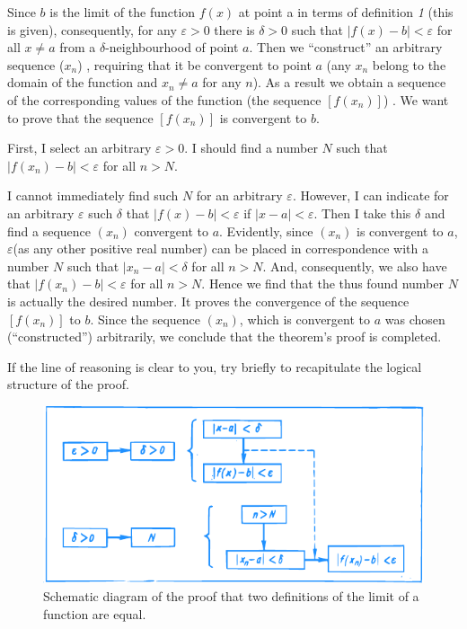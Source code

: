 {Since $b$ is the limit of the function $f (x)$ at point a in terms of definition \emph{1} (this is given), consequently, for any $\varepsilon > 0$ there is $\delta > 0$ such that $| f(x)- b | < \varepsilon$  for all $x \neq a$ from a $\delta$-neighbourhood of point $a$. Then we ``construct''	an	arbitrary	sequence	($x_{n}$) ,	requiring	that	it	be convergent to point $a$ (any $x_{n}$ belong to the domain of the function and $x_{n} \neq a$ for any $n$). As a result we obtain a sequence of the corresponding values of the function (the sequence	$[f (x_{n} ) ]$) .	We	want	to	prove	that	the	sequence $[f (x_{n} )]$ is convergent to $b$.

First, I select an arbitrary $\varepsilon > 0$. I should find a number $N$ such that $|f(x_{n}) -	b| < \varepsilon$ for all $n > N$.

I cannot immediately find such $N$ for an arbitrary $\varepsilon$. However, I can indicate for an arbitrary $\varepsilon$ such $\delta$ that $| f(x)- b | < \varepsilon$  
if $|x- a| < \varepsilon$. Then I take this $\delta$ and find a sequence $(x_{n})$ convergent to $a$. Evidently, since $(x_{n})$ is convergent to $a$,  $\varepsilon$(as any other positive real number) can be placed in correspondence with a number $N$ such that $|x_{n} - a| < \delta$ for all $n > N$. And, consequently, we
also have that $|f(x_{n}) - b| < \varepsilon$ for all $n > N$. Hence we find that the thus found number $N$ is actually the desired number.	It proves	the	convergence	of	the	sequence $[f (x_{n} )]$ to	$b$. Since	the sequence	$(x_{n} )$,	which	is	convergent	to	$a$ was chosen (``constructed'') arbitrarily, we conclude that the theorem's proof is completed.

If the line of reasoning is clear to you, try briefly to recapitulate the logical 
structure of the proof.

\begin{figure}[!ht]%
\centering
\includegraphics[width=\textwidth]{figures/fig-30.pdf}
\caption{Schematic diagram of the proof that two definitions of the limit of a function are equal.}
\label{fig-30}
\end{figure}

}
